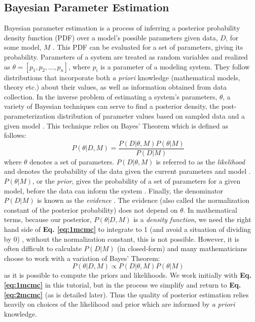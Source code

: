 \documentclass{article}
\begin{document}
\subsection{Bayesian Parameter Estimation}
Bayesian parameter estimation is a process of inferring a posterior probability density function (PDF) over a model's possible parameters given data, $D$, for some model, $M$ \cite{astrostats}. This PDF can be evaluated for a set of parameters, giving its probability. Parameters of a system are treated as random variables and realized as $\theta = [p_1, p_2,...,p_n]$, where $p_i$ is a parameter of a modeling system. They follow distributions that incorporate both \emph{a priori} knowledge (mathematical models, theory etc.) about their values, as well as information obtained from data collection. In the inverse problem of estimating a system's parameters, $\theta$, a variety of Bayesian techniques can serve to find a posterior density, the post-parameterization distribution of parameter values based on sampled data and a given model \cite{bayesprior}. This technique relies on Bayes' Theorem which is defined as follows:
\begin{equation} \label{eq:1mcmc}
P(\theta | D, M) = \frac{P(D|\theta, M)P(\theta|M)}{P(D|M)}
\end{equation}
where $\theta$ denotes a set of parameters. $P(D|\theta, M)$ is referred to as the \emph{likelihood} and denotes the probability of the data given the current parameters and model \cite{astrostats}. $P(\theta|M)$, or the \emph{prior}, gives the probability of a set of parameters for a given model, before the data can inform the system \cite{astrostats}. Finally, the denominator $P(D|M)$ is known as the \emph{evidence} \cite{astrostats}. The evidence (also called the normalization constant of the posterior probability) does not depend on $\theta$. In mathematical terms, because our posterior, $P(\theta|D,M)$ is a \textit{density function}, we need the right hand side of \textbf{Eq. \ref{eq:1mcmc}} to integrate to 1 (and avoid a situation of dividing by 0) \cite{bayesprior}, without the normalization constant, this is not possible. However, it is often difficult to calculate $P(D|M)$ (in closed-form) and many mathematicians choose to work with a variation of Bayes' Theorem:
\begin{equation} \label{eq:2mcmc}
P(\theta|D,M) \propto P(D|\theta,M)P(\theta|M)
\end{equation}
as it is possible to compute the priors and likelihoods. We work initially with \textbf{Eq. \ref{eq:1mcmc}} in this tutorial, but in the process we simplify and return to \textbf{Eq. \ref{eq:2mcmc}} (as is detailed later). Thus the quality of posterior estimation relies heavily on choices of the likelihood and prior which are informed by \textit{a priori} knowledge.
\end{document}

